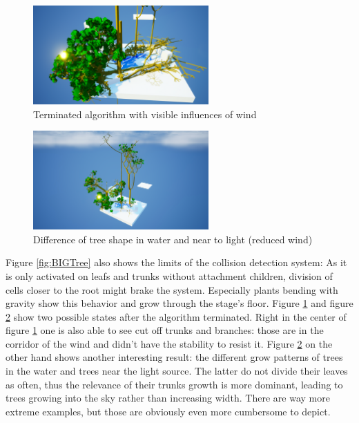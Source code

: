 \documentclass[11pt]{scrartcl}
\begin{document}
\begin{figure}
 	 \centering
 	    \includegraphics[width=0.6\textwidth]{SS_StageWithWind.png}
 	 \caption{Terminated algorithm with visible influences of wind}
 	 \label{fig:StageWind}
\end{figure}

\begin{figure}
 	 \centering
 	    \includegraphics[width=0.6\textwidth]{SS_StageTallTrees.png}
 	 \caption{Difference of tree shape in water and near to light (reduced wind)}
 	 \label{fig:StageTallTrees}
\end{figure}

Figure \ref{fig:BIGTree} also shows the limits of the collision detection system: As it is only activated on leafs and trunks without attachment children, division of cells closer to the root might brake the system. Especially plants bending with gravity show this behavior and grow through the stage's floor. Figure \ref{fig:StageWind} and figure \ref{fig:StageTallTrees} show two possible states after the algorithm terminated. Right in the center of figure \ref{fig:StageWind} one is also able to see cut off trunks and branches: those are in the corridor of the wind and didn't have the stability to resist it. Figure \ref{fig:StageTallTrees} on the other hand shows another interesting result: the different grow patterns of trees in the water and trees near the light source. The latter do not divide their leaves as often, thus the relevance of their trunks growth is more dominant, leading to trees growing into the sky rather than increasing width. There are way more extreme examples, but those are obviously even more cumbersome to depict.
\end{document}
